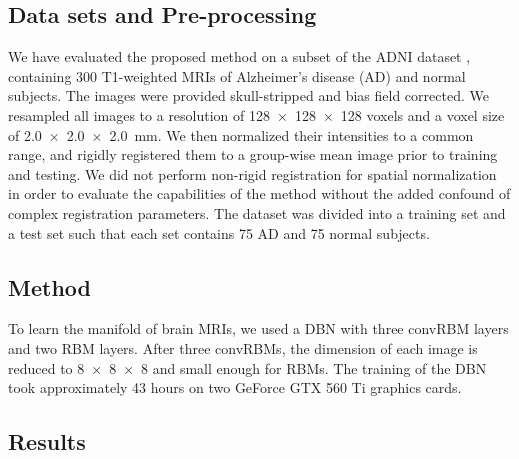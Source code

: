 \subsection{Data sets and Pre-processing}

We have evaluated the proposed method on a subset of the ADNI dataset
\cite{petersen2010}, containing 300 T1-weighted MRIs of Alzheimer's disease (AD)
and normal subjects. The images were provided skull-stripped and bias field
corrected. We resampled all images to a resolution of \num{128x128x128} voxels
and a voxel size of \SI{2.0x2.0x2.0}{\milli\meter}. We then normalized their
intensities to a common range, and rigidly registered them to a group-wise mean
image prior to training and testing. We did not perform non-rigid registration
for spatial normalization in order to evaluate the capabilities of the method
without the added confound of complex registration parameters. The dataset was
divided into a training set and a test set such that each set contains 75 AD and
75 normal subjects.

\subsection{Method}

To learn the manifold of brain MRIs, we used a DBN with
three convRBM layers and two RBM layers. After three convRBMs, the dimension of
each image is reduced to \num{8x8x8} and small enough for RBMs. The training of
the DBN took approximately 43 hours on two GeForce GTX 560 Ti graphics cards.




\subsection{Results}


